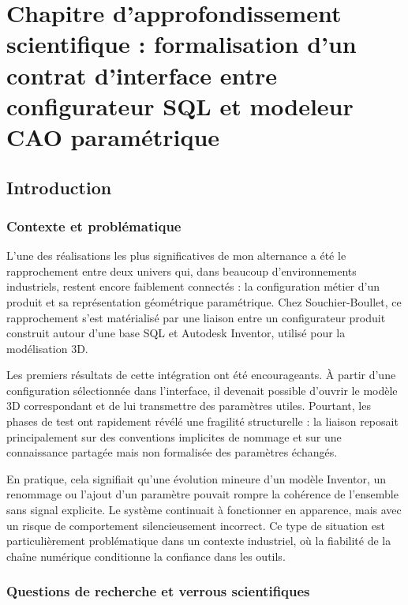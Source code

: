 \chapter[Chapitre d'approfondissement scientifique]{Chapitre d'approfondissement scientifique : formalisation d'un contrat d'interface entre configurateur SQL et modeleur CAO paramétrique}

\section{Introduction}

\subsection{Contexte et problématique}

L'une des réalisations les plus significatives de mon alternance a été le rapprochement entre deux univers qui, dans beaucoup d'environnements industriels, restent encore faiblement connectés : la configuration métier d'un produit et sa représentation géométrique paramétrique. Chez Souchier-Boullet, ce rapprochement s'est matérialisé par une liaison entre un configurateur produit construit autour d'une base SQL et Autodesk Inventor, utilisé pour la modélisation 3D.

Les premiers résultats de cette intégration ont été encourageants. À partir d'une configuration sélectionnée dans l'interface, il devenait possible d'ouvrir le modèle 3D correspondant et de lui transmettre des paramètres utiles. Pourtant, les phases de test ont rapidement révélé une fragilité structurelle : la liaison reposait principalement sur des conventions implicites de nommage et sur une connaissance partagée mais non formalisée des paramètres échangés.

En pratique, cela signifiait qu'une évolution mineure d'un modèle Inventor, un renommage ou l'ajout d'un paramètre pouvait rompre la cohérence de l'ensemble sans signal explicite. Le système continuait à fonctionner en apparence, mais avec un risque de comportement silencieusement incorrect. Ce type de situation est particulièrement problématique dans un contexte industriel, où la fiabilité de la chaîne numérique conditionne la confiance dans les outils.

\subsection{Questions de recherche et verrous scientifiques}

